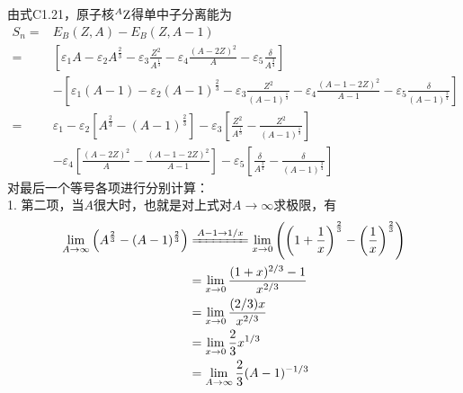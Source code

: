 \vspace{3mm}
\begin{exercise}
    由式C1.21，原子核$^{A}{\rm Z}$得单中子分离能为
    \begin{equation*}
        \begin{aligned}
            S_n =& E_B(Z, A) - E_B(Z, A - 1)    \\
                =& \left[ \varepsilon_1 A - \varepsilon_2 A^{\frac{2}{3}}
                  - \varepsilon_3 \frac{Z^2}{A^{\frac{1}{3}}} 
                  - \varepsilon_4 \frac{(A - 2Z)^2}{A}
                  - \varepsilon_5 \frac{\delta}{A^{\frac{3}{4}}}\right] \\
                  &-
                  \left[ \varepsilon_1 (A - 1) - \varepsilon_2 (A - 1)^{\frac{2}{3}}
                  - \varepsilon_3 \frac{Z^2}{(A - 1)^{\frac{1}{3}}} 
                  - \varepsilon_4 \frac{(A - 1 - 2Z)^2}{A - 1}
                  - \varepsilon_5 \frac{\delta}{{(A - 1)}^{\frac{3}{4}}}\right] \\
                =& \varepsilon_1 - \varepsilon_2\left[A^{\frac{2}{3}} - (A - 1)^{\frac{2}{3}}\right]
                  -\varepsilon_3\left[\frac{Z^2}{A^{\frac{1}{3}}} - \frac{Z^2}{(A - 1)^{\frac{1}{3}}}\right] \\
                 & -\varepsilon_4\left[\frac{(A - 2Z)^2}{A} - \frac{(A - 1 - 2Z)^2}{A - 1} \right]
                  -\varepsilon_5\left[\frac{\delta}{A^{\frac{3}{4}}} - \frac{\delta}{{(A - 1)}^{\frac{3}{4}}}\right]
        \end{aligned}
    \end{equation*}
    对最后一个等号各项进行分别计算：\\
    1. 第二项，当$A$很大时，也就是对上式对$A\rightarrow \infty$求极限，有
    \begin{equation}
        \begin{aligned}
            \lim_{A \to \infty} \left(A^{\frac{2}{3}} - (A - 1)^{\frac{2}{3}} \right)
            &\xlongequal[]{A - 1 \to 1/x} \lim_{x \to 0} \left(\left(1 + \frac{1}{x}\right)^{\frac{2}{3}}
            - \left(\frac{1}{x}\right)^{\frac{2}{3}} \right) \\
            &= \lim_{x \to 0} \frac{(1 + x)^{2/3} - 1}{x^{2/3}} \\
            &= \lim_{x \to 0} \frac{(2/3) x}{x^{2/3}} \\
            &= \lim_{x \to 0} \frac{2}{3} x^{1/3}     \\
            &= \lim_{A \to \infty} \frac{2}{3} (A - 1)^{-1/3}

\end{aligned}
\end{equation}
\end{exercise}
